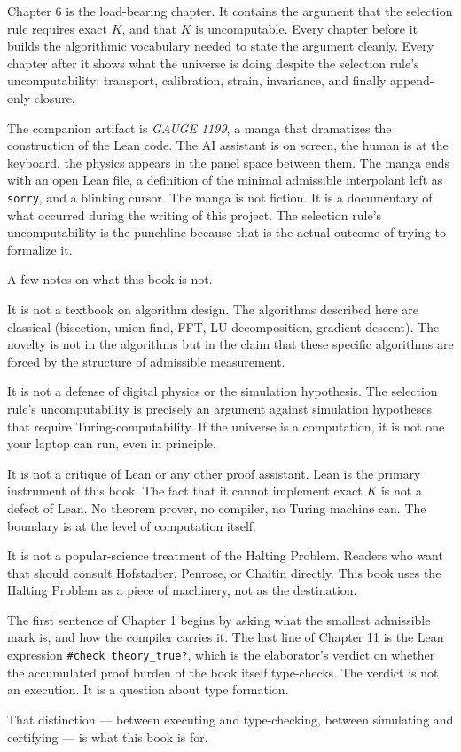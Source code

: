 Chapter 6 is the load-bearing chapter. It contains the argument that the
selection rule requires exact $K$, and that $K$ is uncomputable. Every
chapter before it builds the algorithmic vocabulary needed to state the
argument cleanly. Every chapter after it shows what the universe is doing
despite the selection rule's uncomputability: transport, calibration,
strain, invariance, and finally append-only closure.

The companion artifact is \emph{GAUGE 1199}, a manga that dramatizes the
construction of the Lean code. The AI assistant is on screen, the human is
at the keyboard, the physics appears in the panel space between them. The
manga ends with an open Lean file, a definition of the minimal admissible
interpolant left as \texttt{sorry}, and a blinking cursor. The manga is not
fiction. It is a documentary of what occurred during the writing of this
project. The selection rule's uncomputability is the punchline because that
is the actual outcome of trying to formalize it.

\bigskip

A few notes on what this book is not.

It is not a textbook on algorithm design. The algorithms described here are
classical (bisection, union-find, FFT, LU decomposition, gradient descent).
The novelty is not in the algorithms but in the claim that these specific
algorithms are forced by the structure of admissible measurement.

It is not a defense of digital physics or the simulation hypothesis. The
selection rule's uncomputability is precisely an argument against simulation
hypotheses that require Turing-computability. If the universe is a
computation, it is not one your laptop can run, even in principle.

It is not a critique of Lean or any other proof assistant. Lean is the
primary instrument of this book. The fact that it cannot implement exact
$K$ is not a defect of Lean. No theorem prover, no compiler, no Turing
machine can. The boundary is at the level of computation itself.

It is not a popular-science treatment of the Halting Problem. Readers who
want that should consult Hofstadter, Penrose, or Chaitin directly. This
book uses the Halting Problem as a piece of machinery, not as the
destination.

\bigskip

The first sentence of Chapter 1 begins by asking what the smallest
admissible mark is, and how the compiler carries it. The last line of
Chapter 11 is the Lean expression \texttt{\#check theory\_true?}, which is
the elaborator's verdict on whether the accumulated proof burden of the
book itself type-checks. The verdict is not an execution. It is a question
about type formation.

That distinction --- between executing and type-checking, between simulating
and certifying --- is what this book is for.
